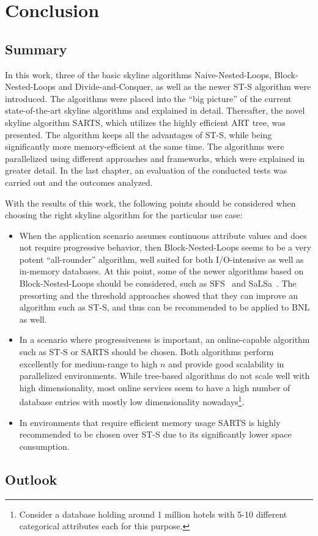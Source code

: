 \chapter{Conclusion}
\label{chapter:Conclusion}

\section{Summary}
In this work, three of the basic skyline algorithms Naive-Nested-Loops, Block-Nested-Loops and Divide-and-Conquer, as well as the newer ST-S algorithm were introduced. The algorithms were placed into the ``big picture'' of the current state-of-the-art skyline algorithms and explained in detail. Thereafter, the novel skyline algorithm SARTS, which utilizes the highly efficient ART tree, was presented. The algorithm keeps all the advantages of ST-S, while being significantly more memory-efficient at the same time. The algorithms were parallelized using different approaches and frameworks, which were explained in greater detail. In the last chapter, an evaluation of the conducted tests was carried out and the outcomes analyzed. 

With the results of this work, the following points should be considered when choosing the right skyline algorithm for the particular use case: 
\begin{itemize}
	\item When the application scenario assumes continuous attribute values and does not require progressive behavior, then Block-Nested-Loops seems to be a very potent ``all-rounder'' algorithm, well suited for both I/O-intensive as well as in-memory databases. At this point, some of the newer algorithms based on Block-Nested-Loops should be considered, such as SFS~\cite{sfs} and SaLSa~\cite{salsa}. The presorting and the threshold approaches showed that they can improve an algorithm such as ST-S, and thus can be recommended to be applied to BNL as well. 
	\item In a scenario where progressiveness is important, an online-capable algorithm such as ST-S or SARTS should be chosen. Both algorithms perform excellently for medium-range to high $n$ and provide good scalability in parallelized environments. While tree-based algorithms do not scale well with high dimensionality, most online services seem to have a high number of database entries with mostly low dimensionality nowadays\footnote{Consider a database holding around 1 million hotels with 5-10 different categorical attributes each for this purpose.}.
	\item In environments that require efficient memory usage SARTS is highly recommended to be chosen over ST-S due to its significantly lower space consumption. 
\end{itemize}

\section{Outlook}
